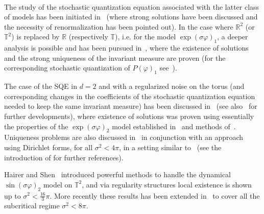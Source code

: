 \documentclass[a4paper,10pt]{article}
\begin{document}
\

The study of the stochastic quantization equation associated with the latter
class of models has been initiated in~{\cite{AHaRu}} (where strong solutions
have been discussed and the necessity of renormalization has been pointed
out). In the case where $\mathbb{R}^2$ (or $\mathbb{T}^2$) is replaced by
$\mathbb{R}$ (respectively $\mathbb{T}$), i.e. for the model $\exp (\sigma
\varphi)_1$, a deeper analysis is possible and has been pursued
in~{\cite{AKaRo}}, where the existence of solutions and the strong uniqueness
of the invariant measure are proven (for the corresponding stochastic
quantization of $P (\varphi)_1$ see~{\cite{Iwata1987}}).

The case of the SQE in $d = 2$ and with a regularized noise on the torus (and
corresponding changes in the coefficients of the stochastic quantization
equation needed to keep the same invariant measure) has been discussed
in~{\cite{Mi}} (see also~{\cite{AKaMiRo}} for further developments), where
existence of solutions was proven using essentially the properties of the
$\exp (\sigma \varphi)_2$ model established in~{\cite{Krohn1974,FroPa}} and
methods of~{\cite{da_prato_strong_2003}}. Uniqueness problems are also
discussed in~{\cite{AKaMiRo}} in conjunction with an approach using Dirichlet
forms, for all $\sigma^2 < 4 \pi$, in a setting similar to~{\cite{Mi}} (see
the introduction of {\cite{AKaMiRo}} for further references).

Hairer and Shen~{\cite{HaiShe}} introduced powerful methods to handle the
dynamical $\sin (\sigma \varphi)_2$ model on $\mathbb{T}^2$, and via
regularity structures local existence is shown up to $\sigma^2 < \frac{16}{3}
\pi$. More recently these results has been extended in~{\cite{ChaHaiShe}} to
cover all the subcritical regime $\sigma^2 < 8 \pi$.

\
\end{document}
